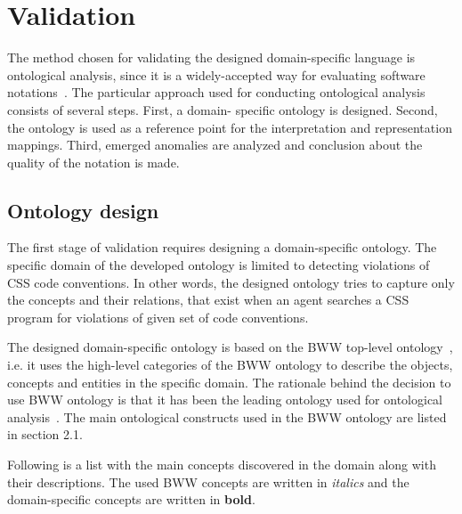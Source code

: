 \documentclass[parskip=full]{uvamscse}
\begin{document}
\section{Validation}

The method chosen for validating the designed domain-specific language is ontological analysis,
since it is a widely-accepted way for evaluating software notations~\cite{opdahl2002ontological,
green2000integrated, moody2009physics, parsons1997using, weber1996analytical}. The particular
approach used for conducting ontological analysis consists of several steps. First, a domain-
specific ontology is designed. Second, the ontology is used as a reference point for the
interpretation and representation mappings. Third, emerged anomalies are analyzed and conclusion
about the quality of the notation is made.

\subsection{Ontology design}

The first stage of validation requires designing a domain-specific ontology. The specific domain of
the developed ontology is limited to detecting violations of CSS code conventions. In other words,
the designed ontology tries to capture only the concepts and their relations, that exist when an
agent searches a CSS program for violations of given set of code conventions.

The designed domain-specific ontology is based on the BWW top-level
ontology~\cite{wand1990ontological}, i.e. it uses the high-level categories of the BWW ontology to
describe the objects, concepts and entities in the specific domain. The rationale behind the
decision to use BWW ontology is that it has been the leading ontology used for ontological
analysis~\cite{moody2009physics}. The main ontological constructs used in the BWW ontology are
listed in section 2.1.

Following is a list with the main concepts discovered in the domain along with their descriptions.
The used BWW concepts are written in \textit{italics} and the domain-specific concepts are written
in \textbf{bold}.
\end{document}
